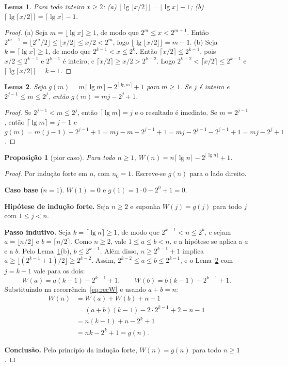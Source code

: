 \documentclass[11pt,a4paper]{article}
\newtheorem{proposicao}{Proposição}
\newtheorem{lema}{Lema}
\begin{document}
\begin{lema}
\label{lema:lg}
Para todo inteiro $x\ge2$: (a) $\lfloor\lg\lfloor x/2\rfloor\rfloor=\lfloor\lg x\rfloor-1$; (b) $\lceil\lg\lceil x/2\rceil\rceil=\lceil\lg x\rceil-1$.
\end{lema}

\begin{proof}
(a) Seja $m=\lfloor\lg x\rfloor\ge1$, de modo que $2^m\le x<2^{m+1}$. Então $2^{m-1}=\lfloor 2^m/2\rfloor\le\lfloor x/2\rfloor\le x/2<2^m$, logo $\lfloor\lg\lfloor x/2\rfloor\rfloor=m-1$.
(b) Seja $k=\lceil\lg x\rceil\ge1$, de modo que $2^{k-1}<x\le2^k$. Então $\lceil x/2\rceil\le2^{k-1}$, pois $x/2\le2^{k-1}$ e $2^{k-1}$ é inteiro; e $\lceil x/2\rceil\ge x/2>2^{k-2}$. Logo $2^{k-2}<\lceil x/2\rceil\le2^{k-1}$ e $\lceil\lg\lceil x/2\rceil\rceil=k-1$.
\end{proof}

\begin{lema}
\label{lema:g}
Seja $g(m)=m\lceil\lg m\rceil-2^{\lceil\lg m\rceil}+1$ para $m\ge1$. Se $j$ é inteiro e $2^{j-1}\le m\le2^j$, então $g(m)=mj-2^j+1$.
\end{lema}

\begin{proof}
Se $2^{j-1}<m\le2^j$, então $\lceil\lg m\rceil=j$ e o resultado é imediato. Se $m=2^{j-1}$, então $\lceil\lg m\rceil=j-1$ e $g(m)=m(j-1)-2^{j-1}+1=mj-m-2^{j-1}+1=mj-2^{j-1}-2^{j-1}+1=mj-2^j+1$.
\end{proof}

\begin{proposicao}[pior caso]
\label{prop:ms}
Para todo $n\ge1$, $W(n)=n\lceil\lg n\rceil-2^{\lceil\lg n\rceil}+1$.
\end{proposicao}

\begin{proof}
Por indução forte em $n$, com $n_0=1$. Escreve-se $g(n)$ para o lado direito.

\textbf{Caso base} ($n=1$). $W(1)=0$ e $g(1)=1\cdot0-2^0+1=0$.

\textbf{Hipótese de indução forte.} Seja $n\ge2$ e suponha $W(j)=g(j)$ para todo $j$ com $1\le j<n$.

\textbf{Passo indutivo.} Seja $k=\lceil\lg n\rceil\ge1$, de modo que $2^{k-1}<n\le2^k$, e sejam $a=\lfloor n/2\rfloor$ e $b=\lceil n/2\rceil$. Como $n\ge2$, vale $1\le a\le b<n$, e a hipótese se aplica a $a$ e a $b$. Pelo Lema~\ref{lema:lg}(b), $b\le2^{k-1}$. Além disso, $n\ge2^{k-1}+1$ implica $a\ge\lfloor(2^{k-1}+1)/2\rfloor\ge2^{k-2}$. Assim, $2^{k-2}\le a\le b\le2^{k-1}$, e o Lema~\ref{lema:g} com $j=k-1$ vale para os dois:
\[
W(a)=a(k-1)-2^{k-1}+1,\qquad W(b)=b(k-1)-2^{k-1}+1.
\]
Substituindo na recorrência~\eqref{eq:recW} e usando $a+b=n$:
\begin{align*}
W(n)&=W(a)+W(b)+n-1\\
&=(a+b)(k-1)-2\cdot2^{k-1}+2+n-1\\
&=n(k-1)+n-2^k+1\\
&=nk-2^k+1=g(n).
\end{align*}

\textbf{Conclusão.} Pelo princípio da indução forte, $W(n)=g(n)$ para todo $n\ge1$.
\end{proof}
\end{document}
